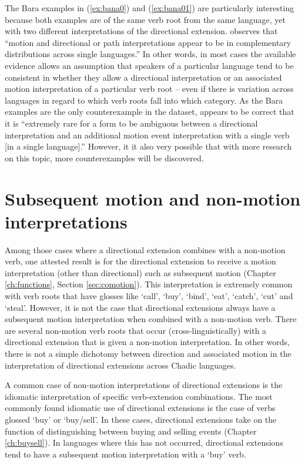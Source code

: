 The Bara examples in (\ref{ex:bana0}) and (\ref{ex:bana01}) are particularly interesting because both examples are of the same verb root from the same language, yet with two different interpretations of the directional extension. \citet[184]{belkadiDeicticDirectionalityAssociated2021} observes that ``motion and directional or path interpretations appear to be in complementary distributions across single languages.'' In other words, in most cases the available evidence allows an assumption that speakers of a particular language tend to be consistent in whether they allow a directional interpretation or an associated motion interpretation of a particular verb root -- even if there is variation across languages in regard to which verb roots fall into which category. As the Bara examples are the only counterexample in the dataset, \citet[184]{belkadiDeicticDirectionalityAssociated2021} appears to be correct that it is ``extremely rare for a form to be ambiguous between a directional interpretation and an additional motion event interpretation with a single verb [in a single language].'' However, it it also very possible that with more research on this topic, more counterexamples will be discovered.

\section{Subsequent motion and non-motion interpretations} \label{sec:interpretingAM}

Among those cases where a directional extension combines with a non-motion verb, one attested result is for the directional extension to receive a motion interpretation (other than directional) such as subsequent motion (Chapter \ref{ch:functions}, Section \ref{sec:comotion}). This interpretation is extremely common with verb roots that have glosses like `call', `buy', `bind', `eat', `catch', `cut' and `steal'. However, it is not the case that directional extensions always have a subsequent motion interpretation when combined with a non-motion verb. There are several non-motion verb roots that occur (cross-linguistically) with a directional extension that is given a non-motion interpretation. In other words, there is not a simple dichotomy between direction and associated motion in the interpretation of directional extensions across Chadic languages. 

A common case of non-motion interpretations of directional extensions is the idiomatic interpretation of specific verb-extension combinations. The most commonly found idiomatic use of directional extensions is the case of verbs glossed `buy' or `buy/sell'. In these cases, directional extensions take on the function of distinguishing between buying and selling events (Chapter \ref{ch:buysell}). In languages where this has not occurred, directional extensions tend to have a subsequent motion interpretation with a `buy' verb. 

